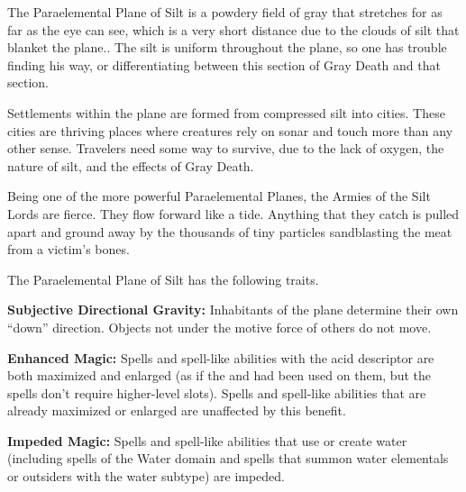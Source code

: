 The Paraelemental Plane of Silt is a powdery field of gray that stretches for as far as the eye can see, which is a very short distance due to the clouds of silt that blanket the plane.. The silt is uniform throughout the plane, so one has trouble finding his way, or differentiating between this section of Gray Death and that section.

Settlements within the plane are formed from compressed silt into cities. These cities are thriving places where creatures rely on sonar and touch more than any other sense. Travelers need some way to survive, due to the lack of oxygen, the nature of silt, and the effects of Gray Death.

Being one of the more powerful Paraelemental Planes, the Armies of the Silt Lords are fierce. They flow forward like a tide. Anything that they catch is pulled apart and ground away by the thousands of tiny particles sandblasting the meat from a victim's bones.

The Paraelemental Plane of Silt has the following traits.
\begin{itemize*}
\item \textbf{Subjective Directional Gravity:} Inhabitants of the plane determine their own ``down'' direction. Objects not under the motive force of others do not move.
\item \textbf{Enhanced Magic:} Spells and spell-like abilities with the acid descriptor are both maximized and enlarged (as if the  and  had been used on them, but the spells don't require higher-level slots). Spells and spell-like abilities that are already maximized or enlarged are unaffected by this benefit.
\item \textbf{Impeded Magic:} Spells and spell-like abilities that use or create water (including spells of the Water domain and spells that summon water elementals or outsiders with the water subtype) are impeded.
\end{itemize*}
